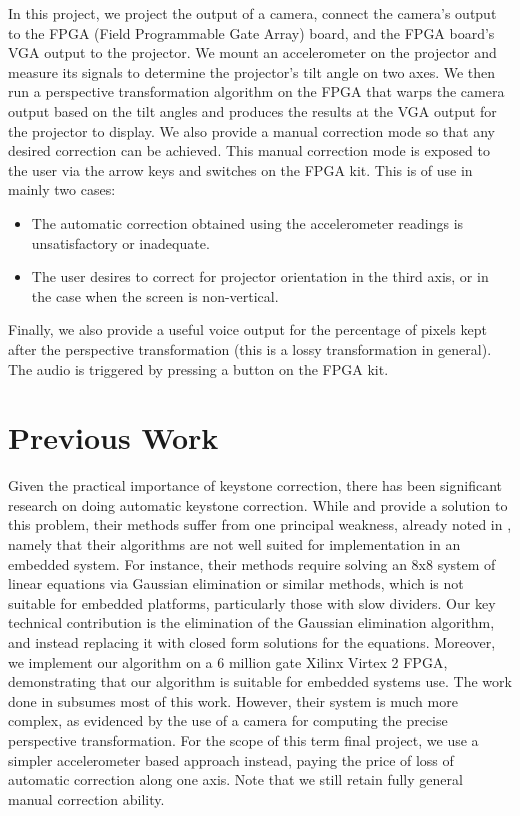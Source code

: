 \documentclass{article}
\begin{document}
In this project, we project the output of a camera, connect the camera's output to the FPGA (Field Programmable Gate Array) board,
and the FPGA board's VGA output to the projector.
We mount an accelerometer on the projector and measure its signals to determine the projector's tilt angle on two axes.
We then run a perspective transformation algorithm on the FPGA that warps the camera output based on the tilt angles and produces the results at the VGA output for the projector to display.
We also provide a manual correction mode so that any desired correction can be achieved.
This manual correction mode is exposed to the user via the arrow keys and switches on the FPGA kit.
This is of use in mainly two cases:
\begin{itemize}
\item The automatic correction obtained using the accelerometer readings is unsatisfactory or inadequate.
\item The user desires to correct for projector orientation in the third axis, or in the case when the screen is non-vertical.
\end{itemize}
Finally, we also provide a useful voice output for the percentage of pixels kept after the perspective transformation (this is a lossy transformation in general).
The audio is triggered by pressing a button on the FPGA kit.

\section{Previous Work}
Given the practical importance of keystone correction, there has been significant research on doing automatic keystone correction.
While \citet{raskar2001self} and \citet{sukthankar2001smarter} provide a solution to this problem, their methods suffer from one principal weakness,
already noted in \citet{baoxin2004automatic}, namely that their algorithms are not well suited for implementation in an embedded system.
For instance, their methods require solving an 8x8 system of linear equations via Gaussian elimination or similar methods,
which is not suitable for embedded platforms, particularly those with slow dividers.
Our key technical contribution is the elimination of the Gaussian elimination algorithm,
and instead replacing it with closed form solutions for the equations.
Moreover, we implement our algorithm on a 6 million gate Xilinx Virtex 2 FPGA, demonstrating that our algorithm is suitable for embedded systems use.
The work done in \citet{baoxin2004automatic} subsumes most of this work.
However, their system is much more complex, as evidenced by the use of a camera for computing the precise perspective transformation.
For the scope of this term final project,
we use a simpler accelerometer based approach instead, paying the price of loss of automatic correction along one axis.
Note that we still retain fully general manual correction ability.
\end{document}
